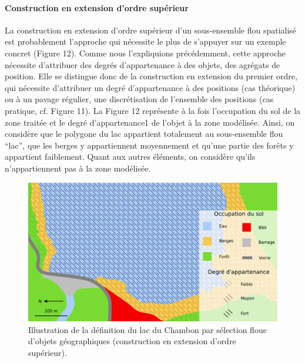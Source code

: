 \paragraph{Construction en extension d'ordre supérieur}

La construction en extension d’ordre supérieur d’un sous-ensemble flou
spatialisé est probablement l’approche qui nécessite le plus de
s’appuyer sur un exemple concret (Figure 12). Comme nous l’expliquions
précédemment, cette approche nécessite d’attribuer des degrés
d’appartenance à des objets, des agrégats de position. Elle se
distingue donc de la construction en extension du premier ordre, qui
nécessite d’attribuer un degré d’appartenance à des positions (cas
théorique) ou à un pavage régulier, une discrétisation de l’ensemble
des positions (cas pratique, cf. Figure 11). La Figure 12 représente à
la fois l’occupation du sol de la zone traitée et le degré
d’appartenance1 de l’objet à la zone modélisée. Ainsi, on considère
que le polygone du lac appartient totalement au sous-ensemble flou
“lac”, que les berges y appartiennent moyennement et qu’une partie des
forêts y appartient faiblement. Quant aux autres éléments, on
considère qu’ils n’appartiennent pas à la zone modélisée.

\begin{figure}
  \centering
  \includegraphics{../figures/fig12.png}
  \caption{Illustration de la définition du lac du Chambon par
    sélection floue d’objets géographiques (\ie construction en
    extension d’ordre supérieur).}
  \label{fig:champ_raster_sel}
\end{figure}

